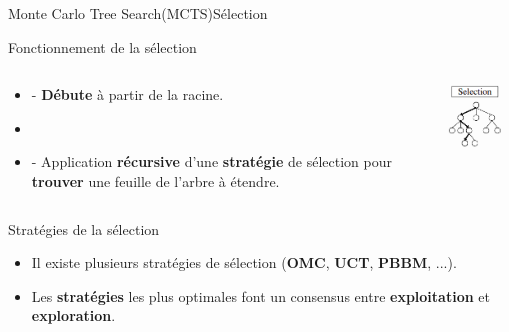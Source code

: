 \begin{frame}{Monte Carlo Tree Search(MCTS)}{Sélection}
	\begin{block}{Fonctionnement de la sélection}
		\begin{columns}
			\begin{column}{7cm}
				\begin{itemize}
					\item - \textbf{Débute} à partir de la racine.
					\item \
					\item - Application \textbf{récursive} d'une \textbf{stratégie} de sélection pour \textbf{trouver} une feuille de l'arbre à étendre.
				\end{itemize}
			\end{column}
			\begin{column}{4cm}
				\includegraphics[width=3cm]{ressources/MCTS/Selection.png}
			\end{column}
		\end{columns}
	\end{block}
	\begin{block}{Stratégies de la sélection}
		\begin{itemize}
			\item Il existe plusieurs stratégies de sélection (\textbf{OMC}, \textbf{UCT}, \textbf{PBBM}, ...).

			\item Les \textbf{stratégies} les plus optimales font un consensus entre \textbf{exploitation} et \textbf{exploration}.
		\end{itemize}
	\end{block}
\end{frame}

